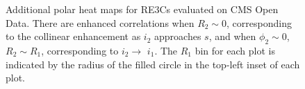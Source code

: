 \begin{figure}[t]
    \vspace{-20pt}
    \centering
     \caption[Additional polar heat maps for RE3Cs evaluated on CMS Open Data.]
    {
        Additional polar heat maps for RE3Cs evaluated on CMS Open Data.
        There are enhanced correlations when \(R_2\sim 0\), corresponding to the collinear enhancement
        as \(i_2\) approaches \(s\), and when \(\phi_2 \sim 0\), \(R_2 \sim R_1\), corresponding to \(i_2 \to\) \(i_1\).
        The \(R_1\) bin for each plot is indicated by the radius of the filled circle in the top-left inset of each plot.
    }
    \label{fig:cms_re3cs}
\end{figure}
